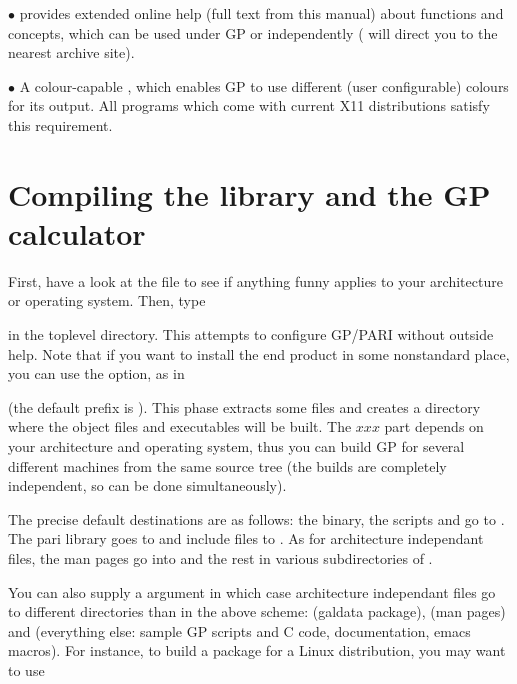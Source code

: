   $\bullet$  provides extended online help (full text from this
manual) about functions and concepts, which can be used under GP or
independently ( will direct you to the nearest
 archive site).

  $\bullet$ A colour-capable , which enables GP to use different
(user configurable) colours for its output. All  programs which
come with current X11 distributions satisfy this requirement.
\vfill\eject
\section{Compiling the library and the GP calculator}

 First, have a look at the  file
to see if anything funny applies to your architecture or operating system.
Then, type 


\noindent in the toplevel directory. This attempts to configure GP/PARI
without outside help. Note that if you want to install the end product in
some nonstandard place, you can use the  option, as in


\noindent (the default prefix is ). This phase extracts some
files and creates a directory  where the object files and
executables will be built. The $xxx$ part depends on your architecture and
operating system, thus you can build GP for several different machines from
the same source tree (the builds are completely independent, so can be done
simultaneously).

 The precise default destinations are as follows:
the  binary, the scripts  and  go to
. The pari library goes to  and include
files to . As for architecture independant files,
the man pages go into  and the rest in various
subdirectories of .

\noindent You can also supply a  argument in which case
architecture independant files go to different directories than in the above
scheme:  (galdata package),  (man pages)
and  (everything else: sample GP scripts and C code,
documentation, emacs macros). For instance, to build a package for a Linux
distribution, you may want to use

